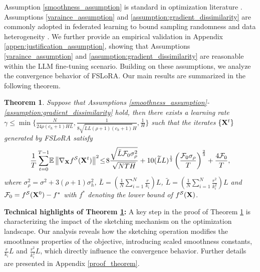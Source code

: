 \documentclass{article} %
\theoremstyle{plain}
\newtheorem{theorem}{Theorem}[section]
\theoremstyle{definition}
\begin{document}
Assumption \ref{smoothness_assumption} is standard in optimization literature \citep{bottou2018optimization,fang2024mtgc,bubeck2015convex}. Assumptions \ref{varaince_assumption} and \ref{assumption:gradient_dissimilarity} are commonly adopted in federated learning to bound sampling randomness and data heterogeneity  \citep{fang2022communication,yi2022zeroth}. 
We further provide an empirical validation in Appendix \ref{appen:justification_assumption}, showing that Assumptions \ref{varaince_assumption} and \ref{assumption:gradient_dissimilarity} are reasonable within the LLM fine-tuning scenario.
Building on these assumptions, we analyze the convergence behavior of FSLoRA. Our main results are summarized in the following theorem.
\begin{theorem}\label{convergence_fed_slora_condense}
    Suppose that Assumptions \ref{smoothness_assumption}-\ref{assumption:gradient_dissimilarity} hold, then there exists a learning rate $\gamma \leq \min \{\frac{N}{24 \rho (c_h + 1) H\bar{L}}, \frac{1}{8\sqrt{\widetilde{L} L (\rho+1) (c_h +1)} H}, \frac{1}{H} \}$ such that the iterates \(\{{\bf X}^t\}\) generated by FSLoRA satisfy 
\begin{align}
\frac{1}{T}\sum_{t=0}^{T-1} \!\mathbb{E} \left\| \nabla_{\bf X} f^{\mathcal{S}} ({\bf X}^t) \right\|^2 \! \leq \! 8 \frac{\sqrt{\bar{L} \mathcal{F}_0 \sigma_{\rho}^2} }{\sqrt{N TH}}
+ 10 (\widetilde{L} L)^{\frac{1}{3}} \left(\frac{\mathcal{F}_0 \sigma_{\rho}}{ T}\right)^{\frac{2}{3}} + \frac{4 \mathcal{F}_0 }{T},
\end{align}
where $ \sigma_{\rho}^2 = \sigma^2 + 3(\rho+1) \sigma_h^2$, \(\bar{L} = \left(\frac{1}{N} \sum_{i=1}^N \frac{r}{ k_i}\right) L \), \(\widetilde{L} = \left(\frac{1}{N} \sum_{i=1}^N \frac{r^2}{ k^2_i}\right) L\) and \(\mathcal{F}_0 = f^{\mathcal{S}}({\bf X}^0)  -  f^*\) with $f^*$ denoting the lower bound of $f^{\mathcal{S}}({\bf X})$.
\end{theorem}
\textbf{Technical highlights of Theorem \ref{convergence_fed_slora_condense}:}
A key step in the proof of Theorem \ref{convergence_fed_slora_condense} is characterizing the impact of the sketching mechanism on the optimization landscape. Our analysis reveals how the sketching operation modifies the smoothness properties of the objective, introducing scaled smoothness constants, $\frac{r}{k_i} L$ and $\frac{r^2}{k_i^2} L$, which directly influence the convergence behavior.
Further details are presented in Appendix \ref{proof_theorem}.  
\end{document}
